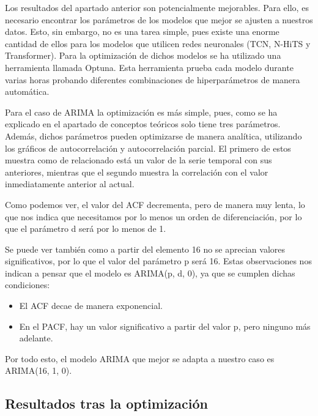 Los resultados del apartado anterior son potencialmente mejorables. Para ello, es necesario encontrar los parámetros de los 
modelos que mejor se ajusten a nuestros datos. Esto, sin embargo, no es una tarea simple, pues existe una enorme 
cantidad de ellos para los modelos que utilicen redes neuronales (TCN, N-HiTS y Transformer). Para la optimización 
de dichos modelos se ha utilizado una herramienta llamada Optuna. Esta herramienta prueba cada modelo durante 
varias horas probando diferentes combinaciones de hiperparámetros de manera automática.

Para el caso de ARIMA la optimización es más simple, pues, como se ha explicado en el apartado de conceptos 
teóricos solo tiene tres parámetros. Además, dichos parámetros pueden optimizarse de manera analítica, utilizando 
los gráficos de autocorrelación y autocorrelación parcial. El primero de estos muestra como de relacionado está 
un valor de la serie temporal con sus anteriores, mientras que el segundo muestra la correlación con el valor 
inmediatamente anterior al actual.


Como podemos ver, el valor del ACF decrementa, pero de manera muy lenta, lo que nos indica que necesitamos 
por lo menos un orden de diferenciación, por lo que el parámetro d será por lo menos de 1. 


Se puede ver también como a partir del elemento 16 no se aprecian valores significativos, por lo que el valor del 
parámetro p será 16. Estas observaciones nos indican a pensar que el modelo es ARIMA(p, d, 0), ya que se cumplen 
dichas condiciones:
\begin{itemize}
    \item El ACF decae de manera exponencial.
    \item En el PACF, hay un valor significativo a partir del valor p, pero ninguno más adelante.
\end{itemize}

Por todo esto, el modelo ARIMA que mejor se adapta a nuestro caso es ARIMA(16, 1, 0).

\subsection{Resultados tras la optimización}

